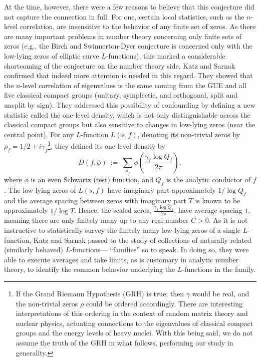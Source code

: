 \documentclass[12pt, reqno,oneside]{amsart}
\theoremstyle{plain}
\theoremstyle{definition}
\theoremstyle{remark}
\theoremstyle{plain}
\numberwithin{equation}{section}
\begin{document}
At the time, however, there were a few reasons to believe that this conjecture did not capture the connection in full. For one, certain local statistics, such as the $n$-level correlation, are insensitive to the behavior of any finite set of zeros. As there are many important problems in number theory concerning only finite sets of zeros (e.g., the Birch and Swinnerton-Dyer conjecture \cite{BS63, BS65} is concerned only with the low-lying zeros of elliptic curve $L$-functions), this marked a considerable shortcoming of the conjecture on the number theory side. Katz and Sarnak \cite{KS99a, KS99b} confirmed that indeed more attention is needed in this regard. They showed that the $n$-level correlation of eigenvalues is the same coming from the GUE and all five classical compact groups (unitary, symplectic, and orthogonal, split and unsplit by sign). They addressed this possibility of confounding by defining a new statistic called the one-level density, which is not only distinguishable across the classical compact groups but also sensitive to changes in low-lying zeros (near the central point). For any $L$-function $L(s,f)$, denoting its non-trivial zeros by $\rho_f=1/2+i\gamma_f$\footnote{If the Grand Riemann Hypothesis (GRH) is true, then $\gamma$ would be real, and the non-trivial zeros $\rho$ could be ordered accordingly. There are interesting interpretations of this ordering in the context of random matrix theory and nuclear physics, actuating connections to the eigenvalues of classical compact groups and the energy levels of heavy nuclei. With this being said, we do not assume the truth of the GRH in what follows, performing our study in generality.}, they defined its one-level density by 
\begin{equation}\label{eq:1-level-density}
   D(f,\phi) \ := \ \sum_{\rho_f}\phi\left(\frac{\gamma_f\log Q_f}{2\pi}\right), 
\end{equation}
where $\phi$ is an even Schwartz (test) function, and $Q_f$ is the analytic conductor of $f$. The low-lying zeros of $L(s,f)$ have imaginary part approximately $1/\log Q_f$ and the average spacing between zeros with imaginary part $T$ is known to be approximately $1/\log T$. Hence, the scaled zeros, $\frac{\gamma_f\log Q_f}{2\pi}$, have average spacing $1$, meaning there are only finitely many up to any real number $C > 0$. As it is not instructive to statistically survey the finitely many low-lying zeros of a single $L$-function, Katz and Sarnak passed to the study of collections of naturally related (similarly behaved) $L$-functions— ``families'' so to speak. In doing so, they were able to execute averages and take limits, as is customary in analytic number theory, to identify the common behavior underlying the $L$-functions in the family.   
\end{document}
